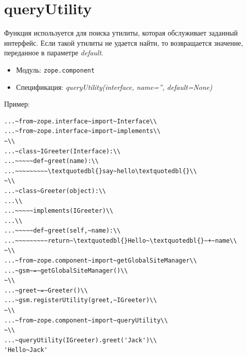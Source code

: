 \documentclass[a4paper,openany,twoside,draft]{book}
\providecommand*{\DUroletitlereference}[1]{\textsl{#1}}
\begin{document}
\section*{queryUtility%
  \label{queryutility}%
}

Функция используется для поиска утилиты, которая обслуживает заданный
интерфейс.  Если такой утилиты не удается найти, то возвращается
значение, переданное в параметре \DUroletitlereference{default}.

\begin{itemize}

\item Модуль: \texttt{zope.component}

\item Спецификация: \DUroletitlereference{queryUtility(interface, name='', default=None)}

\end{itemize}

Пример:

\begin{verbatim}
...~from~zope.interface~import~Interface\\
...~from~zope.interface~import~implements\\
~\\
...~class~IGreeter(Interface):\\
...~~~~~def~greet(name):\\
...~~~~~~~~~\textquotedbl{}say~hello\textquotedbl{}\\
~\\
...~class~Greeter(object):\\
...\\
...~~~~~implements(IGreeter)\\
...\\
...~~~~~def~greet(self,~name):\\
...~~~~~~~~~return~\textquotedbl{}Hello~\textquotedbl{}~+~name\\
~\\
...~from~zope.component~import~getGlobalSiteManager\\
...~gsm~=~getGlobalSiteManager()\\
~\\
...~greet~=~Greeter()\\
...~gsm.registerUtility(greet,~IGreeter)\\
~\\
...~from~zope.component~import~queryUtility\\
~\\
...~queryUtility(IGreeter).greet('Jack')\\
'Hello~Jack'
\end{verbatim}
\end{document}
